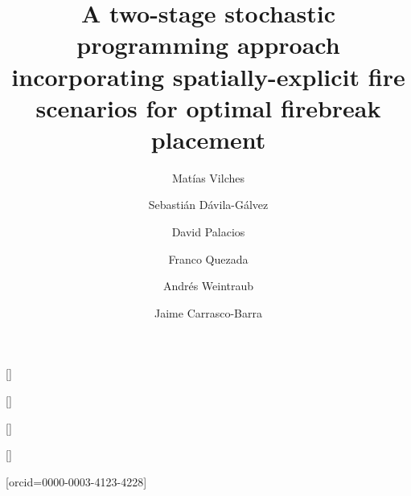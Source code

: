 \documentclass[a4paper,fleqn]{cas-sc}
\begin{document}
\let\WriteBookmarks\relax
\def\floatpagepagefraction{1}
\def\textpagefraction{.001}

\title [mode = title]{A two-stage stochastic programming approach incorporating spatially-explicit fire scenarios for optimal firebreak placement} 

\author[2]{Mat\'ias Vilches}[]



\author[2,4]{Sebasti\'an D\'avila-G\'alvez}\cormark[1]


\author[5]{David Palacios}[]


\author[2,4]{Franco Quezada}[]


\author[3,5]{Andr\'es Weintraub}[]

\author[1,5]{Jaime Carrasco-Barra}[orcid=0000-0003-4123-4228]




\address[1]{Departamento de Industria, Facultad de Ingenier\'ia, Universidad Tecnol\'ogica Metropolitana, Santiago, Chile}

\address[2]{Industrial Engineering Department, Faculty of Engineering, University of Santiago of Chile, Santiago, Chile}

\address[3]{Industrial Engineering Department, University of Chile, Santiago, Chile}

\address[4]{Program for the Development of Sustainable Production Systems, Faculty of Engineering, University of Santiago of Chile, Santiago, Chile}

\address[5]{Complex Engineering System Institute - ISCI, Santiago, Chile}

\end{document}
